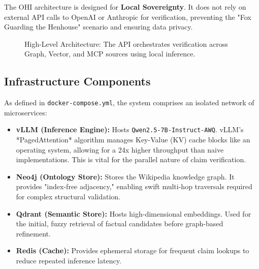 \documentclass[10pt, a4paper, twocolumn]{article}
\begin{document}
The OHI architecture is designed for \textbf{Local Sovereignty}. It does not rely on external API calls to OpenAI or Anthropic for verification, preventing the "Fox Guarding the Henhouse" scenario and ensuring data privacy.

\begin{figure}[ht]
    \centering
    \caption{High-Level Architecture: The API orchestrates verification across Graph, Vector, and MCP sources using local inference.}
    \label{fig:arch}
\end{figure}

\subsection{Infrastructure Components}
As defined in \texttt{docker-compose.yml}, the system comprises an isolated network of microservices:

\begin{itemize}
    \item \textbf{vLLM (Inference Engine):} Hosts \texttt{Qwen2.5-7B-Instruct-AWQ}. vLLM's *PagedAttention* algorithm manages Key-Value (KV) cache blocks like an operating system, allowing for a 24x higher throughput than naive implementations. This is vital for the parallel nature of claim verification.
    \item \textbf{Neo4j (Ontology Store):} Stores the Wikipedia knowledge graph. It provides "index-free adjacency," enabling swift multi-hop traversals required for complex structural validation.
    \item \textbf{Qdrant (Semantic Store):} Hosts high-dimensional embeddings. Used for the initial, fuzzy retrieval of factual candidates before graph-based refinement.
    \item \textbf{Redis (Cache):} Provides ephemeral storage for frequent claim lookups to reduce repeated inference latency.
\end{itemize}
\end{document}
